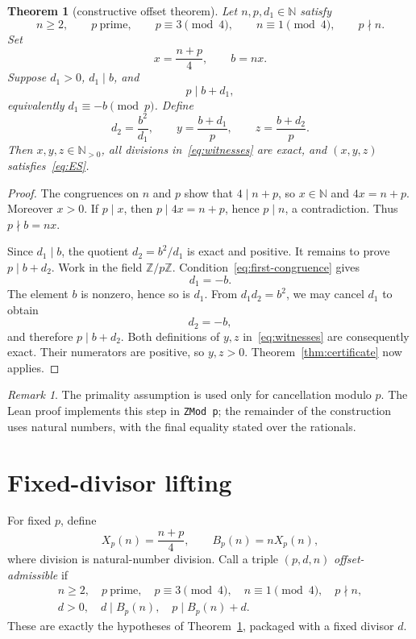 \documentclass[11pt]{article}
\newtheorem{theorem}{Theorem}[section]
\theoremstyle{remark}
\newtheorem*{remark}{Remark}
\newcommand{\N}{\mathbb{N}}
\newcommand{\Z}{\mathbb{Z}}
\begin{document}
\begin{theorem}[constructive offset theorem]\label{thm:offset}
Let \(n,p,d_1\in\N\) satisfy
\[
  n\ge2,\qquad p\ \text{prime},\qquad
  p\equiv3\pmod4,\qquad n\equiv1\pmod4,\qquad p\nmid n.
\]
Set
\[
  x=\frac{n+p}{4},\qquad b=nx.
\]
Suppose \(d_1>0\), \(d_1\mid b\), and
\begin{equation}\label{eq:first-congruence}
  p\mid b+d_1,
\end{equation}
equivalently \(d_1\equiv-b\pmod p\).  Define
\begin{equation}\label{eq:witnesses}
  d_2=\frac{b^2}{d_1},\qquad
  y=\frac{b+d_1}{p},\qquad
  z=\frac{b+d_2}{p}.
\end{equation}
Then \(x,y,z\in\N_{>0}\), all divisions in~\eqref{eq:witnesses} are exact, and
\((x,y,z)\) satisfies~\eqref{eq:ES}.
\end{theorem}

\begin{proof}
The congruences on \(n\) and \(p\) show that \(4\mid n+p\), so \(x\in\N\) and
\(4x=n+p\).  Moreover \(x>0\).  If \(p\mid x\), then
\(p\mid4x=n+p\), hence \(p\mid n\), a contradiction.  Thus \(p\nmid b=nx\).

Since \(d_1\mid b\), the quotient \(d_2=b^2/d_1\) is exact and positive.  It
remains to prove \(p\mid b+d_2\).  Work in the field \(\Z/p\Z\).
Condition~\eqref{eq:first-congruence} gives
\[
  d_1=-b.
\]
The element \(b\) is nonzero, hence so is \(d_1\).  From \(d_1d_2=b^2\), we may
cancel \(d_1\) to obtain
\[
  d_2=-b,
\]
and therefore \(p\mid b+d_2\).  Both definitions of \(y,z\)
in~\eqref{eq:witnesses} are consequently exact.  Their numerators are positive,
so \(y,z>0\).  Theorem~\ref{thm:certificate} now applies.
\end{proof}

\begin{remark}
The primality assumption is used only for cancellation modulo \(p\).  The Lean
proof implements this step in \texttt{ZMod p}; the remainder of the construction
uses natural numbers, with the final equality stated over the rationals.
\end{remark}

\section{Fixed-divisor lifting}

For fixed \(p\), define
\[
  X_p(n)=\frac{n+p}{4},
  \qquad
  B_p(n)=nX_p(n),
\]
where division is natural-number division.  Call a triple \((p,d,n)\)
\emph{offset-admissible} if
\[
\begin{gathered}
  n\ge2,\quad p\ \text{prime},\quad
  p\equiv3\pmod4,\quad n\equiv1\pmod4,\quad p\nmid n,\\
  d>0,\quad d\mid B_p(n),\quad p\mid B_p(n)+d.
\end{gathered}
\]
These are exactly the hypotheses of Theorem~\ref{thm:offset}, packaged with a
fixed divisor \(d\).
\end{document}
